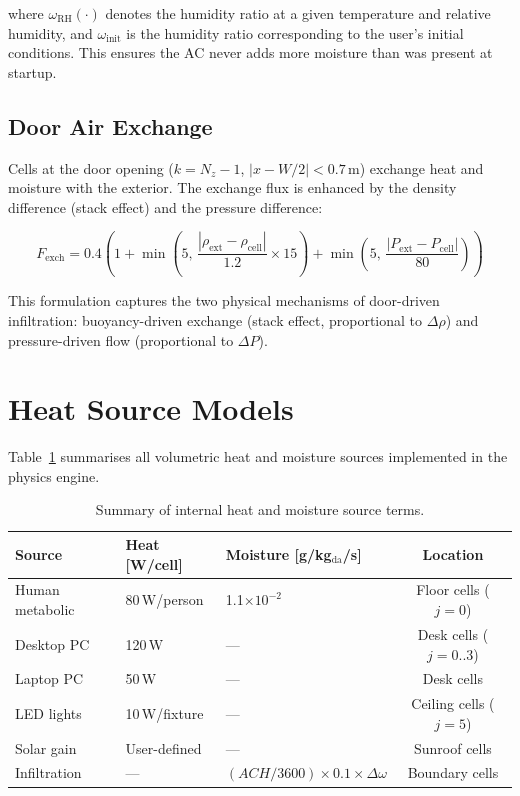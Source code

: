 \documentclass[12pt,a4paper]{report}
\begin{document}
where $\omega_\text{RH}(\cdot)$ denotes the humidity ratio at a given temperature and relative humidity, and $\omega_\text{init}$ is the humidity ratio corresponding to the user's initial conditions. This ensures the AC never adds more moisture than was present at startup.

\subsection{Door Air Exchange}
Cells at the door opening ($k = N_z - 1$, $|x - W/2| < 0.7$\,m) exchange heat and moisture with the exterior. The exchange flux is enhanced by the density difference (stack effect) and the pressure difference:

\begin{equation}
  F_\text{exch} = 0.4\left(1 + \min\!\left(5,\, \frac{|\rho_\text{ext} - \rho_\text{cell}|}{1.2} \times 15\right)
  + \min\!\left(5,\, \frac{|P_\text{ext} - P_\text{cell}|}{80}\right)\right)
  \label{eq:door}
\end{equation}

This formulation captures the two physical mechanisms of door-driven infiltration: buoyancy-driven exchange (stack effect, proportional to $\Delta\rho$) and pressure-driven flow (proportional to $\Delta P$).

\section{Heat Source Models}
\label{sec:sources}

Table~\ref{tab:sources} summarises all volumetric heat and moisture sources implemented in the physics engine.

\begin{table}[H]
\centering
\caption{Summary of internal heat and moisture source terms.}
\label{tab:sources}
\renewcommand{\arraystretch}{1.3}
\begin{tabular}{lllc}
\toprule
\textbf{Source} & \textbf{Heat [W/cell]} & \textbf{Moisture [g/kg$_\text{da}$/s]} & \textbf{Location}\\
\midrule
Human metabolic & 80\,W/person & 1.1$\times10^{-2}$ & Floor cells ($j=0$)\\
Desktop PC & 120\,W & --- & Desk cells ($j=0..3$)\\
Laptop PC & 50\,W & --- & Desk cells\\
LED lights & 10\,W/fixture & --- & Ceiling cells ($j=5$)\\
Solar gain & User-defined & --- & Sunroof cells\\
Infiltration & --- & $(ACH/3600)\!\times\!0.1\!\times\!\Delta\omega$ & Boundary cells\\
\bottomrule
\end{tabular}
\end{table}
\end{document}
